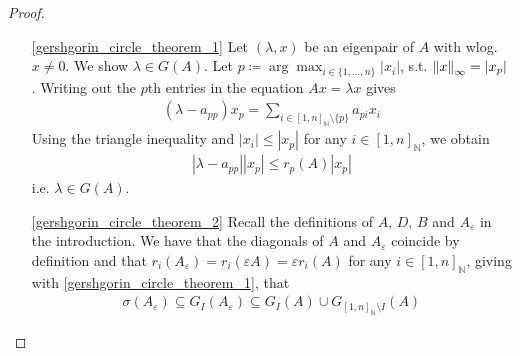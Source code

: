 \documentclass[10pt]{amsart}
\theoremstyle{definition}
\theoremstyle{remark}
\begin{document}
    \begin{proof}
        \begin{enumerate}[wide]
            \item[\ref{gershgorin_circle_theorem_1}] Let \((\lambda, x)\) be an eigenpair of \(A\) with wlog. \(x \neq 0\). We show \(\lambda \in G(A)\). Let \(p \coloneqq \arg\max_{i \in \{1,...,n\}} |x_i|\), s.t. \(\norm{x}_\infty = |x_p|\). Writing out the \(p\)th entries in the equation \(Ax=\lambda x\) gives
            \begin{align}
                (\lambda-a_{pp})x_p = \sum_{i \in [1, n]_{\mathbb{N}} \setminus \{p\}} a_{pi} x_i
            \end{align}
            Using the triangle inequality and \(|x_i| \leq |x_p|\) for any \(i \in [1, n]_{\mathbb{N}}\), we obtain
            \begin{align}
                |\lambda-a_{pp}| |x_p| \leq r_p(A) |x_p|
            \end{align}
            i.e. \(\lambda \in G(A)\).
            \item[\ref{gershgorin_circle_theorem_2}] %
            Recall the definitions of \(A\), \(D\), \(B\) and \(A_\varepsilon\) in the introduction. We have that the diagonals of \(A\) and \(A_{\varepsilon}\) coincide by definition and that \(r_i(A_\varepsilon) = r_i(\varepsilon A) = \varepsilon r_i(A)\) for any \(i \in [1, n]_{\mathbb{N}}\), giving with \ref{gershgorin_circle_theorem_1}, that
            \begin{align}
                \sigma(A_\varepsilon) \subseteq G_I(A_\varepsilon) \subseteq G_I(A) \cup G_{[1, n]_{\mathbb{N}} \setminus I}(A)
            \end{align}

\end{enumerate}
\end{proof}
\end{document}
